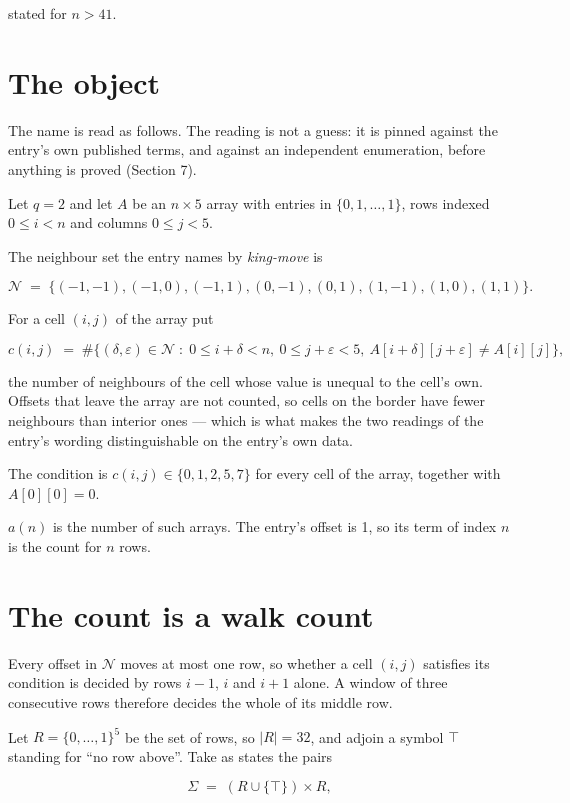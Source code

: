 \documentclass[11pt]{article}
\theoremstyle{definition}
\begin{document}
stated for $n > 41$.

\section{The object}

The name is read as follows. The reading is not a guess: it is pinned against the entry's own published terms, and against an independent enumeration, before anything is proved (Section 7).

Let $q = 2$ and let $A$ be an $n \times 5$ array with entries in $\{0,1,\dots,1\}$, rows indexed $0 \le i < n$ and columns $0 \le j < 5$.

The neighbour set the entry names by {\itshape king-move} is

\[\mathcal{N} \;=\; \{(-1,-1), (-1,0), (-1,1), (0,-1), (0,1), (1,-1), (1,0), (1,1)\}.\]

For a cell $(i,j)$ of the array put

\[c(i,j) \;=\; \#\bigl\{(\delta,\varepsilon)\in\mathcal{N} \;:\; 0\le i+\delta<n,\ 0\le j+\varepsilon<5,\ A[i+\delta][j+\varepsilon] \neq A[i][j]\bigr\},\]

the number of neighbours of the cell whose value is unequal to the cell's own. Offsets that leave the array are not counted, so cells on the border have fewer neighbours than interior ones --- which is what makes the two readings of the entry's wording distinguishable on the entry's own data.

The condition is $c(i,j) \in \{0, 1, 2, 5, 7\}$ for every cell of the array, together with $A[0][0]=0$.

$a(n)$ is the number of such arrays. The entry's offset is 1, so its term of index $n$ is the count for $n$ rows.

\section{The count is a walk count}

Every offset in $\mathcal{N}$ moves at most one row, so whether a cell $(i,j)$ satisfies its condition is decided by rows $i-1$, $i$ and $i+1$ alone. A window of three consecutive rows therefore decides the whole of its middle row.

Let $R = \{0,\dots,1\}^{5}$ be the set of rows, so $|R| = 32$, and adjoin a symbol $\top$ standing for ``no row above''. Take as states the pairs

\[\Sigma \;=\; (R \cup \{\top\}) \times R,\]
\end{document}

